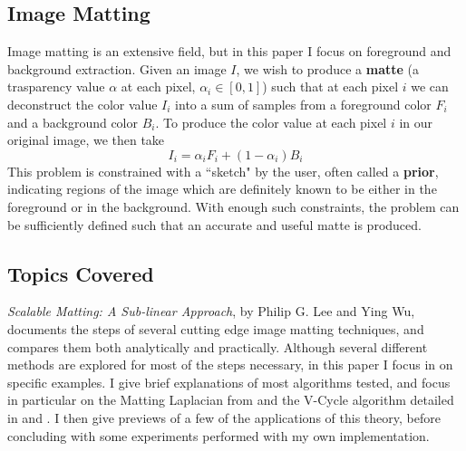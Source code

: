 \subsection{Image Matting}
Image matting is an extensive field, but in this paper I focus on foreground and background extraction. Given an image $I$, we wish to produce a \textbf{matte} (a trasparency value $\alpha$ at each pixel, $\alpha_{i}\in[0,1]$) such that at each pixel $i$ we can deconstruct the color value $I_{i}$ into a sum of samples from a foreground color $F_{i}$ and a background color $B_{i}$. To produce the color value at each pixel $i$ in our original image, we then take
\[I_{i}=\alpha_{i}F_{i}+(1-\alpha_{i})B_{i}\]
This problem is constrained with a ``sketch" by the user, often called a \textbf{prior}, indicating regions of the image which are definitely known to be either in the foreground or in the background. With enough such constraints, the problem can be sufficiently defined such that an accurate and useful matte is produced.
\subsection{Topics Covered}
\textit{Scalable Matting: A Sub-linear Approach}, by Philip G. Lee and Ying Wu, documents the steps of several cutting edge image matting techniques, and compares them both analytically and practically. Although several different methods are explored for most of the steps necessary, in this paper I focus in on specific examples. I give brief explanations of most algorithms tested, and focus in particular on the Matting Laplacian from \cite{levin08} and the V-Cycle algorithm detailed in \cite{briggs87} and \cite{bramble93}. I then give previews of a few of the applications of this theory, before concluding with some experiments performed with my own implementation.